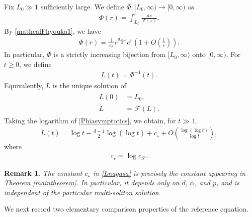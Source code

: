 \documentclass[10pt,a4paper]{amsart}
\newtheorem{remark}{Remark}[section]
\numberwithin{equation}{section}
\begin{document}
Fix $L_0\gg1$ sufficiently large. We define $\Phi:[L_0,\infty)\to[0,\infty)$ as 
\begin{align}\label{Phidef}
\Phi(r)=\int_{L_0}^r\frac{ds}{\mathcal{F}(s)}.
\end{align}
By \eqref{mathcalFhyouka1}, we have
\begin{align}\label{Phiasymptotics}
\Phi(r)=\frac{1}{c_{\mathcal{F}}}r^{\frac{d-1}{2}} e^r\left(1+O\left(\frac{1}{r}\right)\right).
\end{align}
In particular, $\Phi$ is a strictly increasing bijection from $[L_0,\infty)$ onto $[0,\infty)$. For $t\geq0$, we define
\begin{align}\label{LdefPhi}
L(t)=\Phi^{-1}(t).
\end{align}
Equivalently, $L$ is the unique solution of
\begin{align}\label{Lnoode}
\begin{aligned}
L(0)&=L_0,
\\
\dot{L}&=\mathcal{F}(L).
\end{aligned}
\end{align}
Taking the logarithm of \eqref{Phiasymptotics}, we obtain, for $t\gg1$,
\begin{align}\label{Lnagasa}
L(t)=\log{t}-\frac{d-1}{2}\log{(\log{t})}+c_{\star}+O\left(\frac{\log{(\log{t})}}{\log{t}}\right),
\end{align}
where
\begin{align*}
c_{\star}=\log c_{\mathcal{F}}.
\end{align*}

\begin{remark}
The constant $c_{\star}$ in \eqref{Lnagasa} is precisely the constant appearing in Theorem \ref{maintheorem}. In particular, it depends only on $d$, $\alpha$, and $p$, and is independent of the particular multi-soliton solution.
\end{remark}

We next record two elementary comparison properties of the reference equation.
\end{document}
